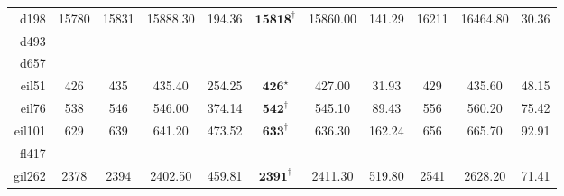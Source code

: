 \documentclass[12pt]{ctexart}
\begin{document}
\begin{table}[htbp]
\begin{tabular}{rcccccccccc}
        d198                          & 15780                             & 15831                       & 15888.30                               & 194.36           & $\textbf{15818}^\dag$   & 15860.00         & 141.29           & 16211                 & 16464.80         & 30.36            \\
        d493                                                                                                                                                                                                                                                                                      \\
        d657                                                                                                                                                                                                                                                                                      \\
        eil51                         & 426                               & 435                         & 435.40                                 & 254.25           & $\textbf{426}^\star$    & 427.00           & 31.93            & 429                   & 435.60           & 48.15            \\
        eil76                         & 538                               & 546                         & 546.00                                 & 374.14           & $\textbf{542}^\dag$     & 545.10           & 89.43            & 556                   & 560.20           & 75.42            \\
        eil101                        & 629                               & 639                         & 641.20                                 & 473.52           & $\textbf{633}^\dag$     & 636.30           & 162.24           & 656                   & 665.70           & 92.91            \\
        fl417                                                                                                                                                                                                                                                                                     \\
        gil262                        & 2378                              & 2394                        & 2402.50                                & 459.81           & $\textbf{2391}^\dag$    & 2411.30          & 519.80           & 2541                  & 2628.20          & 71.41            \\

\end{tabular}
\end{table}
\end{document}
